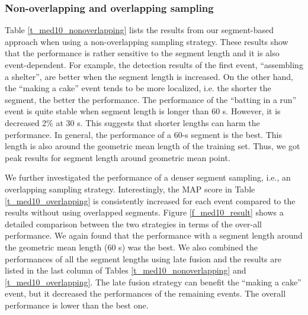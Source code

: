 \subsubsection{Non-overlapping and overlapping sampling}\label{experimentalresult:1} Table \ref{t_med10_nonoverlapping} lists the results from our segment-based approach when using a non-overlapping sampling strategy. These results show that the performance is rather sensitive to the segment length and it is also event-dependent. For example, the detection results of the first event, ``assembling a shelter'', are better when the segment length is increased. On the other hand, the ``making a cake'' event tends to be more localized, i.e. the shorter the segment, the better the performance. The performance of the ``batting in a run'' event is quite stable when segment length is longer than 60 s. However, it is decreased 2\% at 30 s. This suggests that shorter lengths can harm the performance. In general, the performance of a 60-s segment is the best. This length is also around the geometric mean length of the training set. Thus, we got peak results for segment length around geometric mean point. 

We further investigated the performance of a denser segment sampling, i.e., an overlapping sampling strategy. Interestingly, the MAP score in Table \ref{t_med10_overlapping} is consistently increased for each event compared to the results without using overlapped segments. Figure \ref{f_med10_result} shows a detailed comparison between the two strategies in terms of the over-all performance. We again found that the performance with a segment length around the geometric mean length (60 s) was the best. We also combined the performances of all the segment lengths using late fusion and the results are listed in the last column of Tables \ref{t_med10_nonoverlapping} and \ref{t_med10_overlapping}. The late fusion strategy can benefit the ``making a cake'' event, but it decreased the performances of the remaining events. The overall performance is lower than the best one.

